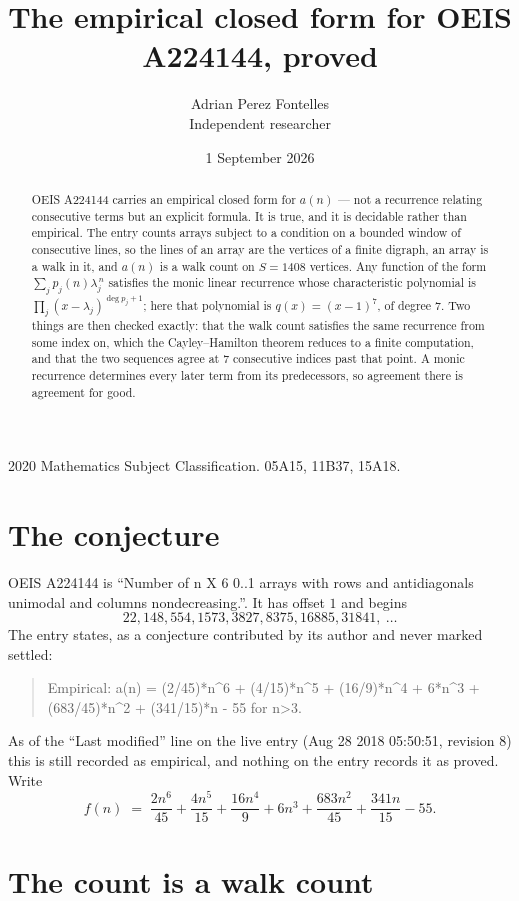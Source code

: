 \documentclass[11pt,a4paper]{article}
\title{The empirical closed form for OEIS A224144, proved}
\author{Adrian Perez Fontelles\\ \small Independent researcher}
\date{1 September 2026}
\theoremstyle{plain}
\theoremstyle{definition}
\begin{document}
\maketitle

\begin{abstract}
OEIS A224144 carries an empirical closed form for $a(n)$ --- not a recurrence relating
consecutive terms but an explicit formula. It is true, and it is decidable rather than
empirical. The entry counts arrays subject to a condition on a bounded window of consecutive lines, so the lines of an array are the
vertices of a finite digraph, an array is a walk in it, and $a(n)$ is a walk count on
$S=1408$ vertices. Any function of the form $\sum_j p_j(n)\lambda_j^{\,n}$ satisfies the
monic linear recurrence whose characteristic polynomial is
$\prod_j(x-\lambda_j)^{\deg p_j+1}$; here that polynomial is $q(x)=(x-1)^{7}$, of degree
$7$. Two things are then checked exactly: that the walk count satisfies the same
recurrence from some index on, which the Cayley--Hamilton theorem reduces to a finite
computation, and that the two sequences agree at $7$ consecutive indices past that
point. A monic recurrence determines every later term from its predecessors, so agreement
there is agreement for good.
\end{abstract}

\noindent\small 2020 Mathematics Subject Classification. 05A15, 11B37, 15A18.\normalsize

\section{The conjecture}

OEIS A224144 is ``Number of n X 6 0..1 arrays with rows and antidiagonals unimodal and columns nondecreasing.''. It has offset $1$ and begins
\[
22, 148, 554, 1573, 3827, 8375, 16885, 31841,\ \dots
\]
The entry states, as a conjecture contributed by its author and never marked settled:
\begin{quote}
Empirical: a(n) = (2/45)*n\^{}6 + (4/15)*n\^{}5 + (16/9)*n\^{}4 + 6*n\^{}3 + (683/45)*n\^{}2 + (341/15)*n - 55 for n>3.
\end{quote}
As of the ``Last modified'' line on the live entry (Aug 28 2018 05:50:51, revision 8) this is still
recorded as empirical, and nothing on the entry records it as proved. Write
\[
f(n)\;=\;\frac{2 n^{6}}{45} + \frac{4 n^{5}}{15} + \frac{16 n^{4}}{9} + 6 n^{3} + \frac{683 n^{2}}{45} + \frac{341 n}{15} - 55.
\]

\section{The count is a walk count}
\end{document}
